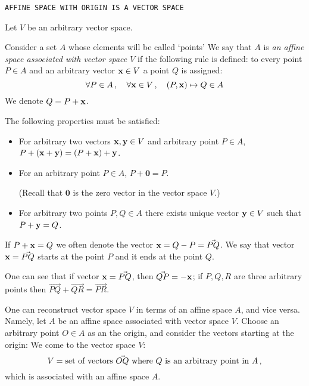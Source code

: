 \documentclass[12pt]{article}
\numberwithin{equation}{section}
\begin{document}
  \centerline  {\tt AFFINE SPACE WITH ORIGIN IS A VECTOR SPACE}   



\medskip

   Let $V$ be an arbitrary  vector space.

    Consider a set $A$ whose elements will be called `points'
   We say that $A$ is 
{\it an affine space associated with vector space $V$}
   if  the following rule is
defined: to every point $P\in A$ and an arbitrary vector ${\bf x}\in V$ 
 a point $Q$ is assigned:  
            \begin{equation}\label{affinerule}
\forall P\in A\,,\quad \forall {\bf x}\in  V\,,\quad
(P,{\bf x})\mapsto Q\in A
               \end{equation}
We denote $Q=P+{\bf x}$.

    The following properties must be satisfied:



\begin{itemize}

\item
For arbitrary  two vectors ${\bf x},{\bf y}\in V$ 
and arbitrary point $P\in A$,\\
   $P+({\bf x}+{\bf y})=(P+{\bf x})+{\bf y}$.

\item 
For an arbitrary point $P\in A$,  $P+{\mathbf 0}=P$. 

\noindent 
(Recall that ${\mathbf 0}$ is the zero 
vector in the vector space $V$.)

\item
  For arbitrary  two points $P,Q\in A$ there exists 
unique vector  ${\bf y}\in V$ such that $P+{\bf y}=Q$.

\end{itemize}

  If $P+{\bf x}=Q$ we often denote the vector ${\bf x}=Q-P=\vec{PQ}$.
  We say that vector ${\bf x}=\vec{PQ}$ starts at the point $P$
and it ends at the point $Q$.

  One can see that 
 if vector ${\bf x}=\vec{PQ}$, then $\vec{QP}=-{\bf x}$;
if $P,Q,R$ are three arbitrary points 
then $\vec{PQ}+\vec{QR}=\vec{PR}$.

\smallskip

One can reconstruct vector space $V$ in terms 
of an affine space $A$, 
and vice versa.  Namely, let $A$ be an affine space 
associated with vector space
 $V$. Choose an arbitrary point $O\in A$ as an the origin, 
and consider the vectors
starting at the   origin:  We come to the vector space $V$:
                  \begin{equation*}
        V=\hbox {set of vectors $\vec {OQ}$ where $Q$ is an 
arbitrary point in $A$}\,,
                  \end{equation*}
which is associated with an affine space $A$.
\end{document}
